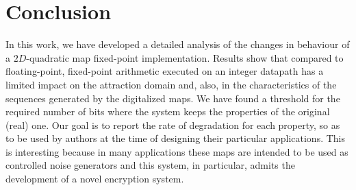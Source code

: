 \section{Conclusion} \label{sec:conclusions}
In this work, we have developed a detailed analysis of the changes in behaviour of a $2D$-quadratic map fixed-point implementation. Results show that compared to floating-point, fixed-point arithmetic executed on an integer datapath has a limited impact on the attraction domain and, also, in the characteristics of the sequences generated by the digitalized maps. We have found a threshold for the required 
number of bits where the system keeps the properties of the original (real) one. Our goal is to report the rate of degradation for each property, so as to be used by authors at the time of designing their particular applications. 
This is interesting because in many applications these maps are intended to be used as controlled noise generators and this system, in particular, admits the development of a novel encryption system.